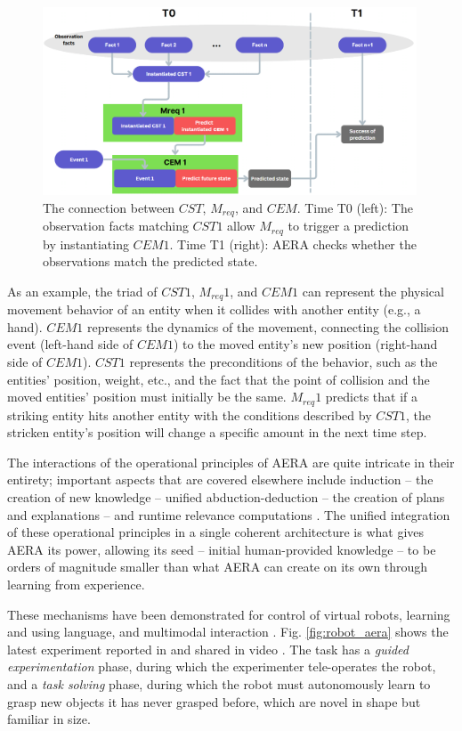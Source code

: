 \documentclass[runningheads]{llncs}
\begin{document}
\begin{figure}
	\centering
	\includegraphics[width=0.99\textwidth]{AERAblockdiagram2.png}
	\caption{The connection between $CST$, $M_{req}$, and $CEM$. 
		Time T0 (left): The observation facts matching $CST1$ allow $M_{req}$ to trigger a prediction by instantiating $CEM1$. 
		Time T1 (right): AERA checks whether the observations match the predicted state.} 
	\label{fig:AERA}
\end{figure}

As an example, the triad of $CST1$, $M_{req}1$, and $CEM1$ can represent the physical movement behavior of an entity when it collides with another entity (e.g., a hand). $CEM1$ represents the dynamics of the movement, connecting the collision event (left-hand side of $CEM1$) to the moved entity’s new position (right-hand side of $CEM1$). $CST1$ represents the preconditions of the behavior, such as the entities’ position, weight, etc., and the fact that the point of collision and the moved entities' position must initially be the same. $M_{req}1$ predicts that if a striking entity hits another entity with the conditions described by $CST1$, the stricken entity’s position will change a specific amount in the next time step.

The interactions of the operational principles of AERA are quite intricate in their entirety; important aspects that are covered elsewhere include induction – the creation of new knowledge – unified abduction-deduction – the creation of plans and explanations – and runtime relevance computations \cite{nivel2013towards}. The unified integration of these operational principles in a single coherent architecture is what gives AERA its power, allowing its seed – initial human-provided knowledge – to be orders of magnitude smaller than what AERA can create on its own through learning from experience. 

These mechanisms have been demonstrated for control of virtual robots, learning and using language, and multimodal interaction \cite{thorisson2014autonomous}.
Fig. \ref{fig:robot_aera} shows the latest experiment reported in \cite{sheikhlar2024autonomous} and shared in video  \cite{Sheikhlar_video_2024}. 
The task has a \textit{guided experimentation} phase, during which the experimenter tele-operates the robot, and a \textit{task solving} phase, during which the robot must autonomously learn to grasp new objects it has never grasped before, which are novel in shape but familiar in size.
\end{document}
